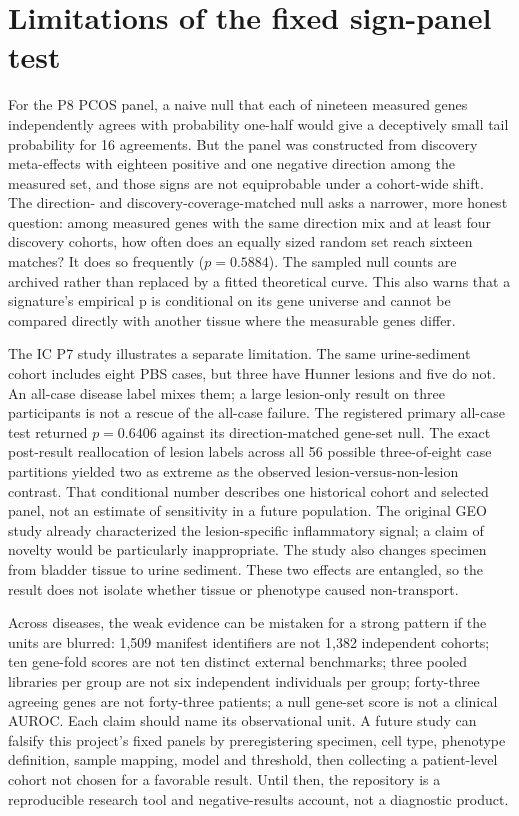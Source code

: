 \documentclass[11pt,a4paper]{article}
\begin{document}
\section{Limitations of the fixed sign-panel test}
For the P8 PCOS panel, a naive null that each of nineteen measured genes independently agrees with probability one-half would give a deceptively small tail probability for 16 agreements. But the panel was constructed from discovery meta-effects with eighteen positive and one negative direction among the measured set, and those signs are not equiprobable under a cohort-wide shift. The direction- and discovery-coverage-matched null asks a narrower, more honest question: among measured genes with the same direction mix and at least four discovery cohorts, how often does an equally sized random set reach sixteen matches? It does so frequently ($p=0.5884$). The sampled null counts are archived rather than replaced by a fitted theoretical curve. This also warns that a signature's empirical p is conditional on its gene universe and cannot be compared directly with another tissue where the measurable genes differ.

The IC P7 study illustrates a separate limitation. The same urine-sediment cohort includes eight PBS cases, but three have Hunner lesions and five do not. An all-case disease label mixes them; a large lesion-only result on three participants is not a rescue of the all-case failure. The registered primary all-case test returned $p=0.6406$ against its direction-matched gene-set null. The exact post-result reallocation of lesion labels across all 56 possible three-of-eight case partitions yielded two as extreme as the observed lesion-versus-non-lesion contrast. That conditional number describes one historical cohort and selected panel, not an estimate of sensitivity in a future population. The original GEO study already characterized the lesion-specific inflammatory signal; a claim of novelty would be particularly inappropriate. The study also changes specimen from bladder tissue to urine sediment. These two effects are entangled, so the result does not isolate whether tissue or phenotype caused non-transport.

Across diseases, the weak evidence can be mistaken for a strong pattern if the units are blurred: 1,509 manifest identifiers are not 1,382 independent cohorts; ten gene-fold scores are not ten distinct external benchmarks; three pooled libraries per group are not six independent individuals per group; forty-three agreeing genes are not forty-three patients; a null gene-set score is not a clinical AUROC. Each claim should name its observational unit. A future study can falsify this project's fixed panels by preregistering specimen, cell type, phenotype definition, sample mapping, model and threshold, then collecting a patient-level cohort not chosen for a favorable result. Until then, the repository is a reproducible research tool and negative-results account, not a diagnostic product.
\end{document}
